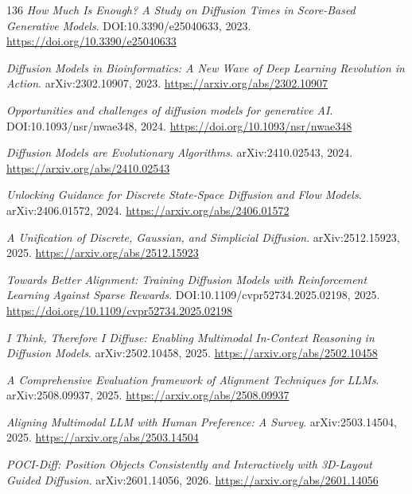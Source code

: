 \documentclass[11pt,a4paper]{article}
\begin{document}
\begin{thebibliography}{136}
\newblock \emph{How Much Is Enough? A Study on Diffusion Times in Score-Based Generative Models}.
\newblock DOI:10.3390/e25040633, 2023.
\newblock \url{https://doi.org/10.3390/e25040633}

\newblock \emph{Diffusion Models in Bioinformatics: A New Wave of Deep Learning Revolution in Action}.
\newblock arXiv:2302.10907, 2023.
\newblock \url{https://arxiv.org/abs/2302.10907}

\newblock \emph{Opportunities and challenges of diffusion models for generative AI}.
\newblock DOI:10.1093/nsr/nwae348, 2024.
\newblock \url{https://doi.org/10.1093/nsr/nwae348}

\newblock \emph{Diffusion Models are Evolutionary Algorithms}.
\newblock arXiv:2410.02543, 2024.
\newblock \url{https://arxiv.org/abs/2410.02543}

\newblock \emph{Unlocking Guidance for Discrete State-Space Diffusion and Flow Models}.
\newblock arXiv:2406.01572, 2024.
\newblock \url{https://arxiv.org/abs/2406.01572}

\newblock \emph{A Unification of Discrete, Gaussian, and Simplicial Diffusion}.
\newblock arXiv:2512.15923, 2025.
\newblock \url{https://arxiv.org/abs/2512.15923}

\newblock \emph{Towards Better Alignment: Training Diffusion Models with Reinforcement Learning Against Sparse Rewards}.
\newblock DOI:10.1109/cvpr52734.2025.02198, 2025.
\newblock \url{https://doi.org/10.1109/cvpr52734.2025.02198}

\newblock \emph{I Think, Therefore I Diffuse: Enabling Multimodal In-Context Reasoning in Diffusion Models}.
\newblock arXiv:2502.10458, 2025.
\newblock \url{https://arxiv.org/abs/2502.10458}

\newblock \emph{A Comprehensive Evaluation framework of Alignment Techniques for LLMs}.
\newblock arXiv:2508.09937, 2025.
\newblock \url{https://arxiv.org/abs/2508.09937}

\newblock \emph{Aligning Multimodal LLM with Human Preference: A Survey}.
\newblock arXiv:2503.14504, 2025.
\newblock \url{https://arxiv.org/abs/2503.14504}

\newblock \emph{POCI-Diff: Position Objects Consistently and Interactively with 3D-Layout Guided Diffusion}.
\newblock arXiv:2601.14056, 2026.
\newblock \url{https://arxiv.org/abs/2601.14056}


\end{thebibliography}
\end{document}
